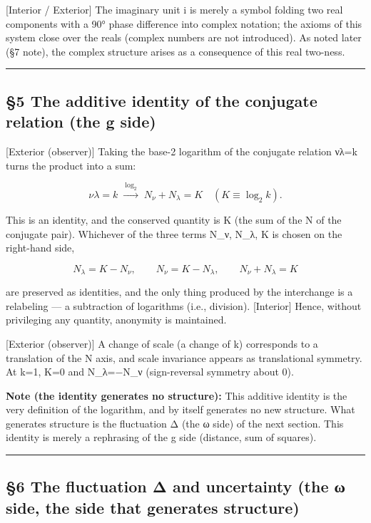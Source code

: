 \documentclass[11pt]{ltjsarticle}
\begin{document}
{[}Interior / Exterior{]} The imaginary unit i is merely a symbol
folding two real components with a 90° phase difference into complex
notation; the axioms of this system close over the reals (complex
numbers are not introduced). As noted later (§7 note), the complex
structure arises as a consequence of this real two-ness.

\begin{center}\rule{0.5\linewidth}{0.5pt}\end{center}

\subsection{§5 The additive identity of the conjugate relation (the g
side)}\label{the-additive-identity-of-the-conjugate-relation-the-g-side}

{[}Exterior (observer){]} Taking the base-2 logarithm of the conjugate
relation νλ=k turns the product into a sum:

\[\nu\lambda=k \;\xrightarrow{\ \log_2\ }\; N_\nu + N_\lambda = K \quad(K\equiv\log_2 k).\]

This is an identity, and the conserved quantity is K (the sum of the N
of the conjugate pair). Whichever of the three terms N\_ν, N\_λ, K is
chosen on the right-hand side,

\[N_\lambda = K - N_\nu,\qquad N_\nu = K - N_\lambda,\qquad N_\nu + N_\lambda = K\]

are preserved as identities, and the only thing produced by the
interchange is a relabeling --- a subtraction of logarithms (i.e.,
division). {[}Interior{]} Hence, without privileging any quantity,
anonymity is maintained.

{[}Exterior (observer){]} A change of scale (a change of k) corresponds
to a translation of the N axis, and scale invariance appears as
translational symmetry. At k=1, K=0 and N\_λ=−N\_ν (sign-reversal
symmetry about 0).

\textbf{Note (the identity generates no structure):} This additive
identity is the very definition of the logarithm, and by itself
generates no new structure. What generates structure is the fluctuation
Δ (the ω side) of the next section. This identity is merely a rephrasing
of the g side (distance, sum of squares).

\begin{center}\rule{0.5\linewidth}{0.5pt}\end{center}

\subsection{§6 The fluctuation Δ and uncertainty (the ω side, the side
that generates
structure)}\label{the-fluctuation-ux3b4-and-uncertainty-the-ux3c9-side-the-side-that-generates-structure}
\end{document}
